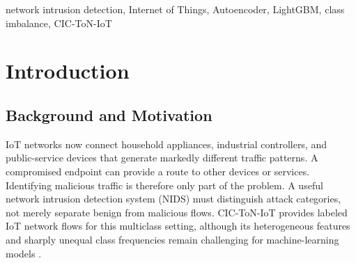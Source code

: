 \documentclass[conference]{IEEEtran}
\begin{document}
\begin{abstract}
Class imbalance and high-dimensional traffic features complicate multiclass intrusion detection in Internet of Things environments. This work evaluates a leakage-controlled Autoencoder--LightGBM pipeline on 5,351,760 CIC-ToN-IoT flows. After invalid rows and non-informative fields are removed, 69 numerical features are split using stratified sampling and scaled with training-only parameters. A symmetric Autoencoder compresses them to 16 latent features, and LightGBM is trained with no imbalance handling, balanced class weights, random upsampling, or random downsampling. On the unchanged 1,070,117-row test set, class weighting provides the best latent macro recall and macro F1, 0.5620 and 0.4249. No handling reaches 0.8436 accuracy but only 0.3142 macro F1. Random upsampling performs nearly identically at 5.07 times the classifier training cost. An original-69 baseline reaches 0.5406 macro F1, showing that 76.81 percent compression loses some discriminative information. Contradictory DoS/DDoS labels also limit class separability. Class weighting is therefore preferred for balanced latent-space detection, while compression remains an efficiency trade-off rather than an accuracy improvement.
\end{abstract}

\begin{IEEEkeywords}
network intrusion detection, Internet of Things, Autoencoder, LightGBM, class imbalance, CIC-ToN-IoT
\end{IEEEkeywords}

\section{Introduction}
\subsection{Background and Motivation}
IoT networks now connect household appliances, industrial controllers, and public-service devices that generate markedly different traffic patterns. A compromised endpoint can provide a route to other devices or services. Identifying malicious traffic is therefore only part of the problem. A useful network intrusion detection system (NIDS) must distinguish attack categories, not merely separate benign from malicious flows. CIC-ToN-IoT provides labeled IoT network flows for this multiclass setting, although its heterogeneous features and sharply unequal class frequencies remain challenging for machine-learning models \cite{Sarhan2022,Ma2025FSLLM}.
\end{document}
